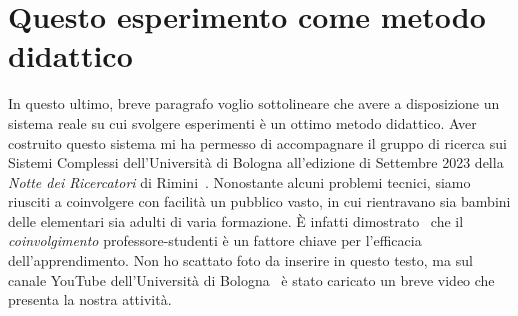 \section{Questo esperimento come metodo didattico}
In questo ultimo, breve paragrafo voglio sottolineare che avere a disposizione
un sistema reale su cui svolgere esperimenti è un ottimo metodo didattico.
Aver costruito questo sistema mi ha permesso di
accompagnare il gruppo di ricerca sui Sistemi Complessi dell'Università di Bologna
all'edizione di Settembre 2023 della \emph{Notte dei Ricercatori} di Rimini~\cite{notteRicercator}.
Nonostante alcuni problemi tecnici, siamo riusciti a coinvolgere con facilità un pubblico
vasto, in cui rientravano sia bambini delle elementari sia adulti di
varia formazione.
È infatti dimostrato~\cite{Hake_1998} che il \emph{coinvolgimento} professore-studenti
è un fattore chiave per l'efficacia dell'apprendimento.
Non ho scattato foto da inserire in questo testo,
ma sul canale YouTube dell'Università di Bologna~\cite{youtube} è stato caricato un breve
video che presenta la nostra attività.